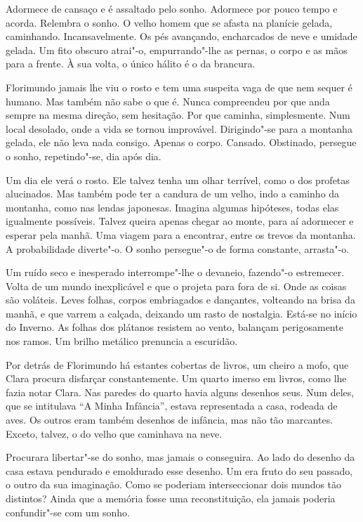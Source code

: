 Adormece de cansaço e é assaltado pelo sonho. Adormece por pouco tempo e
acorda. Relembra o sonho. O velho homem que se afasta na planície
gelada, caminhando. Incansavelmente. Os pés avançando, encharcados de
neve e umidade gelada. Um fito obscuro atrai"-o, empurrando"-lhe as
pernas, o corpo e as mãos para a frente. À sua volta, o único hálito é o
da brancura.

Florimundo jamais lhe viu o rosto e tem uma suspeita vaga de que nem
sequer é humano. Mas também não sabe o que é. Nunca compreendeu por que
anda sempre na mesma direção, sem hesitação. Por que caminha,
simplesmente. Num local desolado, onde a vida se tornou improvável.
Dirigindo"-se para a montanha gelada, ele não leva nada consigo. Apenas o
corpo. Cansado. Obstinado, persegue o sonho, repetindo"-se, dia após dia.

Um dia ele verá o rosto. Ele talvez tenha um olhar terrível, como o dos
profetas alucinados. Mas também pode ter a candura de um velho, indo a
caminho da montanha, como nas lendas japonesas. Imagina algumas
hipóteses, todas elas igualmente possíveis. Talvez queira apenas chegar
ao monte, para aí adormecer e esperar pela manhã. Uma viagem para a
encontrar, entre os trevos da montanha. A probabilidade diverte"-o. O
sonho persegue"-o de forma constante, arrasta"-o.

Um ruído seco e inesperado interrompe"-lhe o devaneio, fazendo"-o
estremecer. Volta de um mundo inexplicável e que o projeta para fora de
si. Onde as coisas são voláteis. Leves folhas, corpos embriagados e
dançantes, volteando na brisa da manhã, e que varrem a calçada, deixando
um rasto de nostalgia. Está-se no início do Inverno. As folhas dos
plátanos resistem ao vento, balançam perigosamente nos ramos. Um brilho
metálico prenuncia a escuridão.

Por detrás de Florimundo há estantes cobertas de livros, um cheiro a
mofo, que Clara procura disfarçar constantemente. Um quarto imerso em
livros, como lhe fazia notar Clara. Nas paredes do quarto havia alguns
desenhos seus. Num deles, que se intitulava ``A Minha Infância'', estava
representada a casa, rodeada de aves. Os outros eram também desenhos de
infância, mas não tão marcantes. Exceto, talvez, o do velho que
caminhava na neve.

Procurara libertar"-se do sonho, mas jamais o conseguira. Ao lado do
desenho da casa estava pendurado e emoldurado esse desenho. Um era fruto
do seu passado, o outro da sua imaginação. Como se poderiam
interseccionar dois mundos tão distintos? Ainda que a memória fosse uma
reconstituição, ela jamais poderia confundir"-se com um sonho.

